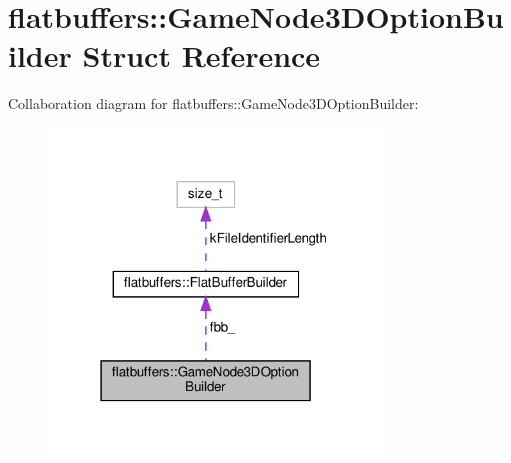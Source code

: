 \hypertarget{structflatbuffers_1_1GameNode3DOptionBuilder}{}\section{flatbuffers\+:\+:Game\+Node3\+D\+Option\+Builder Struct Reference}
\label{structflatbuffers_1_1GameNode3DOptionBuilder}


Collaboration diagram for flatbuffers\+:\+:Game\+Node3\+D\+Option\+Builder\+:
\nopagebreak
\begin{figure}[H]
\begin{center}
\leavevmode
\includegraphics[width=250pt]{structflatbuffers_1_1GameNode3DOptionBuilder__coll__graph}
\end{center}
\end{figure}
